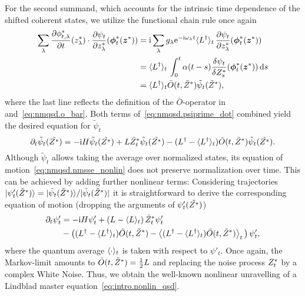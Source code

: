 For the second summand, which accounts for the intrinsic time dependence of the shifted coherent states, we utilize the functional chain rule once again
\begin{align*}
  \sum_\lambda \frac{\partial\ccphitla}{\partial t}(\cc z_\lambda) \cdot \frac{\partial\psi_t}{\partial \cc z_\lambda} (\cc{\vec\phi}_t(\cc\zz))
  &= \ii \sum_\lambda g_\lambda \exp[-\ii \omega_\lambda t] \qmean{\adj L}_t \, \frac{\partial\psi_t}{\partial \cc z_\lambda} (\cc{\vec\phi}_t(\cc\zz)) \\
  &= \qmean{\adj L}_t \, \int_0^t \alpha(t - s) \frac{\delta \psi_t}{\delta \ZZ_s} (\cc{\vec\phi}_t(\cc\zz)) \dd s \\
  &= \qmean{\adj L}_t \bar O(t, \tildeZZ) \tilde\psi_t(\tildeZZ),
\end{align*}
where the last line reflects the definition of the $\bar O$-operator in  and~\ref{eq:nmqsd.o_bar}.
Both terms of~\ref{eq:nmqsd.psiprime_dot} combined yield the desired equation for $\tilde\psi_t$
\begin{equation}
  \partial_t \tilde\psi_t(\tilde{{Z}^*}) = -\mathrm{i}H \tilde\psi_t(\tilde{{Z}^*}) + L{\tilde Z}^*_t\tilde\psi_t(\tilde{{Z}^*}) - (L^\dagger - \langle L^\dagger \rangle_t) \bar O(t, {\tilde Z}^*) \tilde\psi_t(\tilde{{Z}^*}).
  \label{eq:nmqsd.nmsse_nonlin}
\end{equation}
Although $\tilde\psi_t$ allows taking the average over normalized states, its equation of motion~\ref{eq:nmqsd.nmsse_nonlin} does not preserve normalization over time.
This can be achieved by adding further nonlinear terms:
Considering trajectories $| \psi'_t({\tilde Z}^*) \rangle = | \tilde\psi_t({\tilde Z}^*) \rangle / \vert \tilde\psi_t({\tilde Z}^*) \vert$ it is straightforward to derive the corresponding equation of motion \cite{DiGiSt98_nmqsd} (dropping the arguments of $\psi'_t(\tilde{{Z}^*})$)
\begin{align}
  \partial_t\psi'_t &= -\mathrm{i}H\psi'_t  +  \left(L - \langle L \rangle_t\right) {\tilde Z}^*_t\psi'_t  \nonumber \\
  &-  \left( (L^\dagger - \langle L^\dagger \rangle_t) \bar O(t, {\tilde Z}^*) - \left\langle(L^\dagger - \langle L^\dagger \rangle_t) \bar O(t, {\tilde Z}^*) \right\rangle_t \, \right) \psi'_t,
  \label{eq:nmqsd.nmsse_nonlin_full}
\end{align}
where the quantum average $\langle \cdot \rangle_t$ is taken with respect to $\psi'_t$.
Once again, the Markov-limit amounts to $\bar O(t, {\tilde Z}^*) = \frac{1}{2} L$ and replacing the noise process ${Z}^*_t$ by a complex White Noise.
Thus, we obtain the well-known nonlinear unravelling of a Lindblad master equation~\ref{eq:intro.nonlin_qsd}.\\



